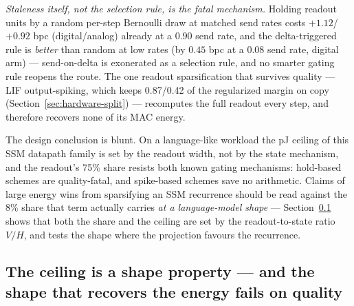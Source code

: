 \emph{Staleness itself, not the selection rule, is the fatal mechanism.} Holding readout
units by a random per-step Bernoulli draw at matched send rates costs $+1.12$/$+0.92$ bpc
(digital/analog) already at a 0.90 send rate, and the delta-triggered rule is
\emph{better} than random at low rates (by $0.45$ bpc at a $0.08$ send rate, digital arm)
--- send-on-delta is exonerated as a selection rule, and no smarter gating rule reopens
the route. The one readout sparsification that survives quality --- LIF output-spiking,
which keeps 0.87/0.42 of the regularized margin on copy
(Section~\ref{sec:hardware-split}) --- recomputes the full readout every step, and
therefore recovers none of its MAC energy.

The design conclusion is blunt. On a language-like workload the pJ ceiling of this SSM
datapath family is set by the readout width, not by the state mechanism, and the readout's
75\% share resists both known gating mechanisms: hold-based schemes are quality-fatal, and
spike-based schemes save no arithmetic. Claims of large energy wins from sparsifying an
SSM recurrence should be read against the 8\% share that term actually carries \emph{at a
language-model shape} --- Section~\ref{sec:hardware-shape} shows that both the share and
the ceiling are set by the readout-to-state ratio $V/H$, and tests the shape where the
projection favours the recurrence.

\subsection{The ceiling is a shape property --- and the shape that recovers the energy
fails on quality}
\label{sec:hardware-shape}

